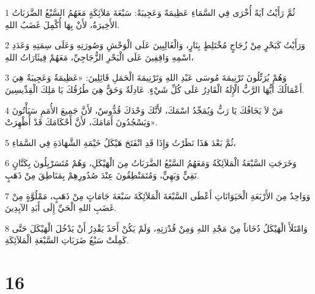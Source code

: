 \par 1 ثُمَّ رَأَيْتُ آيَةً أُخْرَى فِي السَّمَاءِ عَظِيمَةً وَعَجِيبَةً: سَبْعَةَ مَلاَئِكَةٍ مَعَهُمُ السَّبْعُ الضَّرَبَاتُ الأَخِيرَةُ، لأَنْ بِهَا أُكْمِلَ غَضَبُ اللهِ.
\par 2 وَرَأَيْتُ كَبَحْرٍ مِنْ زُجَاجٍ مُخْتَلِطٍ بِنَارٍ، وَالْغَالِبِينَ عَلَى الْوَحْشِ وَصُورَتِهِ وَعَلَى سِمَتِهِ وَعَدَدِ اسْمِهِ وَاقِفِينَ عَلَى الْبَحْرِ الزُّجَاجِيِّ، مَعَهُمْ قِيثَارَاتُ اللهِ،
\par 3 وَهُمْ يُرَتِّلُونَ تَرْنِيمَةَ مُوسَى عَبْدِ اللهِ وَتَرْنِيمَةَ الْحَمَلِ قَائِلِينَ: «عَظِيمَةٌ وَعَجِيبَةٌ هِيَ أَعْمَالُكَ أَيُّهَا الرَّبُّ الْإِلَهُ الْقَادِرُ عَلَى كُلِّ شَيْءٍ. عَادِلَةٌ وَحَقٌّ هِيَ طُرُقُكَ يَا مَلِكَ الْقِدِّيسِينَ.
\par 4 مَنْ لاَ يَخَافُكَ يَا رَبُّ وَيُمَجِّدُ اسْمَكَ، لأَنَّكَ وَحْدَكَ قُدُّوسٌ، لأَنَّ جَمِيعَ الأُمَمِ سَيَأْتُونَ وَيَسْجُدُونَ أَمَامَكَ، لأَنَّ أَحْكَامَكَ قَدْ أُظْهِرَتْ».
\par 5 ثُمَّ بَعْدَ هَذَا نَظَرْتُ وَإِذَا قَدِ انْفَتَحَ هَيْكَلُ خَيْمَةِ الشَّهَادَةِ فِي السَّمَاءِ،
\par 6 وَخَرَجَتِ السَّبْعَةُ الْمَلاَئِكَةُ وَمَعَهُمُ السَّبْعُ الضَّرَبَاتُ مِنَ الْهَيْكَلِ، وَهُمْ مُتَسَرْبِلُونَ بِكَتَّانٍ نَقِيٍّ وَبَهِيٍّ، وَمُتَمَنْطِقُونَ عِنْدَ صُدُورِهِمْ بِمَنَاطِقَ مِنْ ذَهَبٍ.
\par 7 وَوَاحِدٌ مِنَ الأَرْبَعَةِ الْحَيَوَانَاتِ أَعْطَى السَّبْعَةَ الْمَلاَئِكَةَ سَبْعَةَ جَامَاتٍ مِنْ ذَهَبٍ، مَمْلُوَّةٍ مِنْ غَضَبِ اللهِ الْحَيِّ إِلَى أَبَدِ الآبِدِينَ.
\par 8 وَامْتَلَأَ الْهَيْكَلُ دُخَاناً مِنْ مَجْدِ اللهِ وَمِنْ قُدْرَتِهِ، وَلَمْ يَكُنْ أَحَدٌ يَقْدِرُ أَنْ يَدْخُلَ الْهَيْكَلَ حَتَّى كَمِلَتْ سَبْعُ ضَرَبَاتِ السَّبْعَةِ الْمَلاَئِكَةِ.

\chapter{16}

